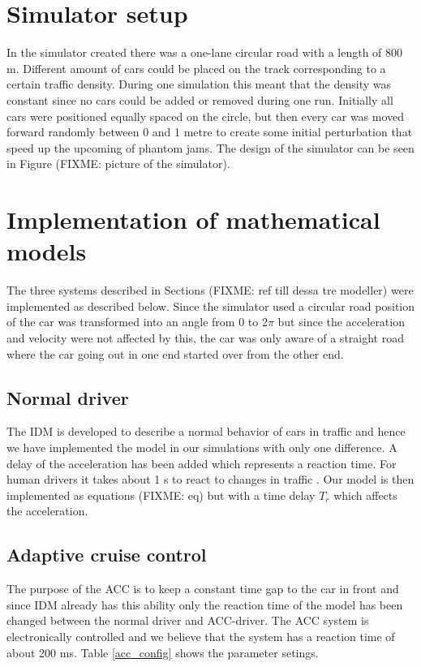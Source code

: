 \section{Simulator setup}
In the simulator created there was a one-lane circular road with a length of 800 m. Different amount of cars could be placed on the track corresponding to a certain traffic density. During one simulation this meant that the density was constant since no cars could be added or removed during one run. Initially all cars were positioned equally spaced on the circle, but then every car was moved forward randomly between 0 and 1 metre to create some initial perturbation that speed up the upcoming of phantom jams. The design of the simulator can be seen in Figure (FIXME: picture of the simulator).

\section{Implementation of mathematical models}
The three systems described in Sections (FIXME: ref till dessa tre modeller) were implemented as described below. Since the simulator used a circular road position of the car was transformed into an angle from 0 to 2\begin{math}\pi\end{math} but since the acceleration and velocity were not affected by this, the car was only aware of a straight road where the car going out in one end started over from the other end.

\subsection {Normal driver}
The IDM is developed to describe a normal behavior of cars in traffic and hence we have implemented the model in our simulations with only one difference. A delay of the acceleration has been added which represents a reaction time. For human drivers it takes about 1 s to react to changes in traffic \cite{idm}. Our model is then implemented as equations (FIXME: eq) but with a time delay \begin{math}T_r\end{math} which affects the acceleration.

\subsection {Adaptive cruise control }
The purpose of the ACC is to keep a constant time gap to the car in front and since IDM already has this ability only the reaction time of the model has been changed between the normal driver and ACC-driver. The ACC system is electronically controlled and we believe that the system has a reaction time of about 200 ms. Table \ref{acc_config} shows the parameter setings.

